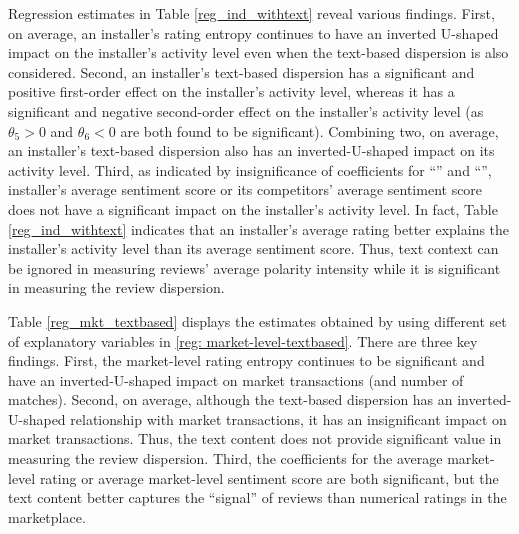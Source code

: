\documentclass[msom,blindrev]{informs3}
\begin{document}
Regression estimates in Table \ref{reg_ind_withtext} reveal various findings. First, on average, an installer's rating entropy continues to have an inverted U-shaped impact on the installer's activity level even when the text-based dispersion is also considered. Second, an installer's text-based dispersion has a significant and positive first-order effect on the installer's activity level, whereas it has a significant and negative second-order effect  on the installer's activity level (as $\theta_{5} > 0$ and $\theta_{6} < 0$ are both found to be significant). Combining two, on average, an installer's text-based dispersion also has an inverted-U-shaped impact on its activity level.
Third, as indicated by insignificance of coefficients for ``'' and ``'', installer's average sentiment score or its competitors' average sentiment score does not have a significant impact on the installer's activity level. In fact,  Table \ref{reg_ind_withtext} indicates that an installer's average rating better explains the installer's activity level than its average sentiment score. Thus, text context can be ignored in measuring reviews' average polarity intensity  while it is significant in measuring the review dispersion.



Table \ref{reg_mkt_textbased} displays the estimates obtained by using different set of explanatory variables in \eqref{reg: market-level-textbased}. There are three key findings. First, the  market-level rating entropy continues to be significant and have an inverted-U-shaped impact on market transactions (and number of matches). Second, on average, although the text-based dispersion has an inverted-U-shaped relationship with market transactions, it has an insignificant impact on market transactions. Thus, the text content does not provide significant value in measuring the review dispersion.  Third, the coefficients for the average market-level rating or average market-level sentiment score are both significant, but the text content better captures the ``signal'' of reviews than numerical ratings in the marketplace.

\end{document}

